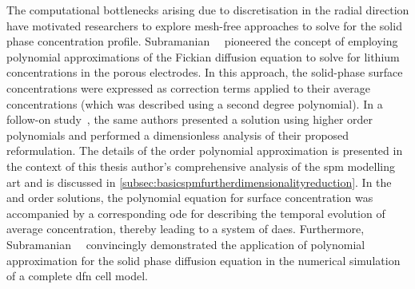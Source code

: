The   computational   bottlenecks  arising   due   to   discretisation  in   the
radial   direction    have   motivated   researchers   to    explore   mesh-free
approaches   to    solve   for   the   solid    phase   concentration   profile.
Subramanian~\etal~\cite{Subramanian2004}  pioneered  the  concept  of  employing
polynomial approximations of the Fickian diffusion equation to solve for lithium
concentrations  in the  porous  electrodes. In  this  approach, the  solid-phase
surface  concentrations were  expressed  as correction  terms  applied to  their
average concentrations (which  was described using a  second degree polynomial).
In  a  follow-on  study~\cite{Subramanian2005},  the same  authors  presented  a
solution using higher  order polynomials and performed  a dimensionless analysis
of  their proposed  reformulation.  The details  of  the   order
polynomial approximation  is presented  in the context  of this  thesis author's
comprehensive  analysis of  the  \gls{spm}  modelling art  and  is discussed  in
\cref{subsec:basicspmfurtherdimensionalityreduction}.  In  the  
and    order  solutions,  the polynomial  equation  for  surface
concentration  was  accompanied  by  a corresponding  \gls{ode}  for  describing
the  temporal  evolution   of  average  concentration,  thereby   leading  to  a
system  of \glspl{dae}.  Furthermore, Subramanian~\etal{}~\cite{Subramanian2007}
convincingly demonstrated  the application  of polynomial approximation  for the
solid  phase  diffusion equation  in  the  numerical  simulation of  a  complete
\gls{dfn} cell model.

